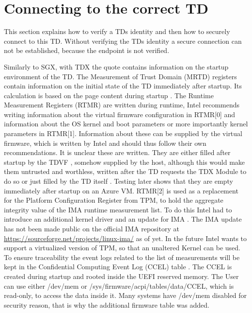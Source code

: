 \section{Connecting to the correct TD}

This section explains how to verify a TDs identity and then how to securely connect to this TD. Without verifying the TDs identity a secure connection can not be established, because the endpoint is not verified.


\label{Identity}
Similarly to SGX, with TDX the quote contains information on the startup environment of the TD. The Measurement of Trust Domain (MRTD) registers contain information on the initial state of the TD immediately after startup. Its calculation is based on the page content during startup \cite{intel_corporation_dcap_2024-1}. The Runtime Measurement Registers (RTMR) are written during runtime, Intel recommends writing information about the virtual firmware configuration in RTMR[0] and information about the OS kernel and boot parameters or more importantly kernel parameters in RTMR[1]. Information about these can be supplied by the virtual firmware, which is written by Intel and should thus follow their own recommendations. It is unclear these are written. They are either filled after startup by the TDVF \cite{intel_corporation_tdx-virtual-firmware-design-guide-rev-004-20231206pdf_2023}, somehow supplied by the host, although this would make them untrusted and worthless, written after the TD requests the TDX Module to do so \cite{intel_corporation_tdx-virtual-firmware-design-guide-rev-004-20231206pdf_2023} or just filled by the TD itself \cite{noauthor_tdx-module-10-public-specpdf_nodate}. Testing later shows that they are empty immediately after startup on an Azure VM.
RTMR[2] is used as a replacement for the Platform Configuration Register from TPM, to hold the aggregate integrity value of the IMA runtime measurement list. To do this Intel had to introduce an additional kernel driver and an update for IMA \cite{haidong_xia_runtime_integrity_measurement_2024}. The IMA update has not been made public on the official IMA repository at \url{https://sourceforge.net/projects/linux-ima/} as of yet. In the future Intel wants to support a virtualized version of TPM, so that an unaltered Kernel can be used. To ensure traceability the event logs related to the list of measurements will be kept in the Confidential Computing Event Log (CCEL) table \cite{haidong_xia_runtime_integrity_measurement_2024}. The CCEL is created during startup and rooted inside the UEFI reserved memory. The User can use either /dev/mem or /sys/firmware/acpi/tables/data/CCEL, which is read-only, to access the data inside it. Many systems have /dev/mem disabled for security reason, that is why the additional firmware table was added.

